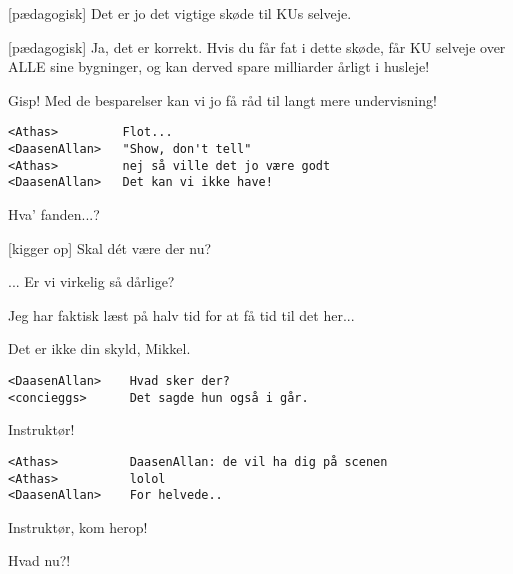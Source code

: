 \documentclass[a4paper,11pt]{article}
\begin{document}
\begin{sketch}

[pædagogisk] Det er jo det vigtige skøde til KUs selveje.

[pædagogisk] Ja, det er korrekt. Hvis du får fat i dette
skøde, får KU selveje over ALLE sine bygninger, og kan derved spare
milliarder årligt i husleje!

 Gisp! Med de besparelser kan vi jo få råd til langt mere
undervisning!


\begin{verbatim}
<Athas>         Flot...
<DaasenAllan>   "Show, don't tell"
<Athas>         nej så ville det jo være godt
<DaasenAllan>   Det kan vi ikke have!
\end{verbatim}



 Hva' fanden...?

[kigger op] Skal dét være der nu?

 ... Er vi virkelig så dårlige?


 Jeg har faktisk læst på halv tid for at få tid til det her...

 Det er ikke din skyld, Mikkel.


\begin{verbatim}
<DaasenAllan>    Hvad sker der?
<concieggs>      Det sagde hun også i går.
\end{verbatim}


 Instruktør!

\begin{verbatim}
<Athas>          DaasenAllan: de vil ha dig på scenen
<Athas>          lolol
<DaasenAllan>    For helvede..
\end{verbatim}

 Instruktør, kom herop!


 Hvad nu?!



\end{sketch}
\end{document}
